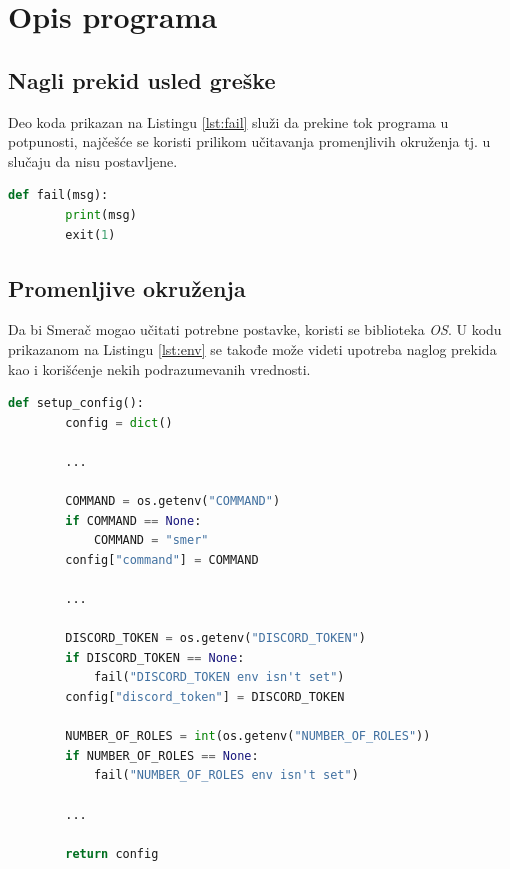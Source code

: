 \documentclass[a4paper,11pt]{article}
\begin{document}
\section{Opis programa}
\subsection{Nagli prekid usled greške}
Deo koda prikazan na Listingu \ref{lst:fail} služi da prekine tok programa u potpunosti, najčešće se koristi prilikom učitavanja promenjlivih okruženja tj. u slučaju da nisu postavljene.
\begin{lstlisting}[language=Python, caption=Nagli prekid usled greške, label=lst:fail]
    def fail(msg):
        print(msg)
        exit(1)
\end{lstlisting}
\subsection{Promenljive okruženja}
Da bi Smerač mogao učitati potrebne postavke, koristi se biblioteka \textit{OS}. U kodu prikazanom na Listingu \ref{lst:env} se takođe može videti upotreba naglog prekida kao i korišćenje nekih podrazumevanih vrednosti.
\begin{lstlisting}[language=Python, caption=Učitavanje promenljivih okruženja, label=lst:env]
    def setup_config():
        config = dict()

        ...

        COMMAND = os.getenv("COMMAND")
        if COMMAND == None:
            COMMAND = "smer"
        config["command"] = COMMAND

        ...

        DISCORD_TOKEN = os.getenv("DISCORD_TOKEN")
        if DISCORD_TOKEN == None:
            fail("DISCORD_TOKEN env isn't set")
        config["discord_token"] = DISCORD_TOKEN

        NUMBER_OF_ROLES = int(os.getenv("NUMBER_OF_ROLES"))
        if NUMBER_OF_ROLES == None:
            fail("NUMBER_OF_ROLES env isn't set")

        ...

        return config
\end{lstlisting}
\newpage
\end{document}
